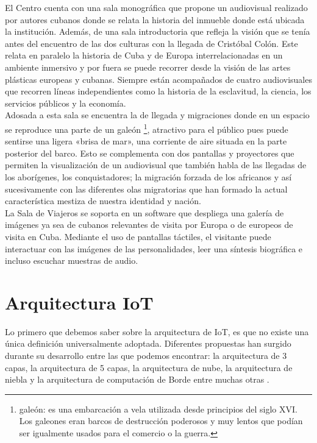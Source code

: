        El Centro cuenta con una sala monográfica que propone un audiovisual realizado por autores cubanos donde se relata la historia del inmueble donde está ubicada la institución. Además, de una sala introductoria que refleja la visión que se tenía antes del encuentro de las dos culturas con la llegada de Cristóbal Colón. Este relata en paralelo la historia de Cuba y de Europa interrelacionadas en un ambiente inmersivo y por fuera se puede recorrer desde la visión de las artes plásticas europeas y cubanas. Siempre están acompañados de cuatro audiovisuales que recorren líneas independientes como la historia de la esclavitud, la ciencia, los servicios públicos y la economía.\\
        
        Adosada a esta sala se encuentra la de llegada y migraciones donde en un espacio se reproduce una parte de un galeón \footnote{gale\'on: es una embarcación a vela utilizada desde principios del siglo XVI. Los galeones eran barcos de destrucción poderosos y muy lentos que podían ser igualmente usados para el comercio o la guerra.}, atractivo para el público pues puede sentirse una ligera «brisa de mar», una corriente de aire situada en la parte posterior del barco. Esto se complementa con dos pantallas y proyectores que permiten la visualización de un audiovisual que también habla de las llegadas de los aborígenes, los conquistadores; la migración forzada de los africanos y así sucesivamente con las diferentes olas migratorias que han formado la actual característica mestiza de nuestra identidad y nación.\\
        
        La Sala de Viajeros se soporta en un software que despliega una galería de imágenes ya sea de cubanos relevantes de visita por Europa o de europeos de visita en Cuba. Mediante el uso de pantallas táctiles, el visitante puede interactuar con las imágenes de las personalidades, leer una síntesis biográfica e incluso escuchar muestras de audio.
    
        
    \section{Arquitectura IoT}\label{sec:arquitecturas}

    Lo primero que debemos saber sobre la arquitectura de IoT, es que no existe una única definición universalmente adoptada. Diferentes propuestas han surgido durante su desarrollo entre las que podemos encontrar: la arquitectura de 3 capas, la arquitectura de 5 capas, la arquitectura de nube, la arquitectura de niebla y la arquitectura de computación de Borde entre muchas otras \cite{arquitecturaIEEE}.

